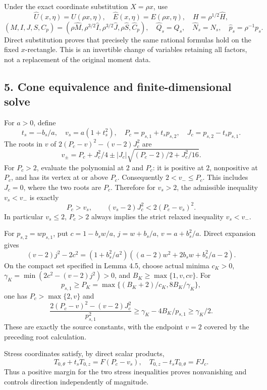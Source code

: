 \documentclass[10pt,a4paper]{article}
\begin{document}
Under the exact coordinate substitution \(X=\rho x\), use
\[
\widehat U(x,\eta)=U(\rho x,\eta),\quad\widehat E(x,\eta)=E(\rho x,\eta),
\quad H=\rho^{1/2}\widehat H,
\]
\[
(M,I,J,S,C_p)=(\rho\widehat M,\rho^{3/2}\widehat I,
\rho^{3/2}\widehat J,\rho\widehat S,\widehat C_p),
\quad\widehat Q_s=Q_s,\quad\widehat N_s=N_s,\quad\widehat p_s=\rho^{-1}p_s.
\]
Direct substitution proves that precisely the same rational formulas hold on the fixed \(x\)-rectangle. This is an invertible change of variables retaining all factors, not a replacement of the original moment data.

\subsection{5. Cone equivalence and finite-dimensional solve}

For \(a>0\), define
\[
t_s=-b_s/a,\quad v_s=a(1+t_s^2),\quad P_c=p_{s,1}+t_sp_{s,2},\quad
J_c=p_{s,2}-t_sp_{s,1}.
\]
The roots in \(v\) of \(2(P_c-v)^2-(v-2)J_c^2\) are
\[
v_\pm=P_c+J_c^2/4\pm |J_c|\sqrt{(P_c-2)/2+J_c^2/16}.
\]
For \(P_c>2\), evaluate the polynomial at \(2\) and \(P_c\): it is positive at \(2\), nonpositive at \(P_c\), and has its vertex at or above \(P_c\). Consequently \(2<v_-\le P_c\). This includes \(J_c=0\), where the two roots are \(P_c\). Therefore for \(v_s>2\), the admissible inequality \(v_s<v_-\) is exactly
\[
P_c>v_s,\qquad (v_s-2)J_c^2<2(P_c-v_s)^2.
\]
In particular \(v_s\le2\), \(P_c>2\) always implies the strict relaxed inequality \(v_s<v_-\).

For \(p_{s,2}=wp_{s,1}\), put \(c=1-b_sw/a\), \(j=w+b_s/a\), \(v=a+b_s^2/a\). Direct expansion gives
\[
(v-2)j^2-2c^2=(1+b_s^2/a^2)((a-2)w^2+2b_sw+b_s^2/a-2).
\]
On the compact set specified in Lemma 4.5, choose actual minima \(c_K>0\), \(\gamma_K=\min(2c^2-(v-2)j^2)>0\), and \(B_K\ge\max\{1,v,cv\}\). For
\[
p_{s,1}\ge P_K=\max\{(B_K+2)/c_K,8B_K/\gamma_K\},
\]
one has \(P_c>\max\{2,v\}\) and
\[
\frac{2(P_c-v)^2-(v-2)J_c^2}{p_{s,1}^2}
\ge\gamma_K-4B_K/p_{s,1}\ge\gamma_K/2.
\]
These are exactly the source constants, with the endpoint \(v=2\) covered by the preceding root calculation.

Stress coordinates satisfy, by direct scalar products,
\[
T_{0,\theta}+t_sT_{0,z}=F(P_c-v_s),\quad
T_{0,z}-t_sT_{0,\theta}=FJ_c.
\]
Thus a positive margin for the two stress inequalities proves nonvanishing and controls direction independently of magnitude.
\end{document}
